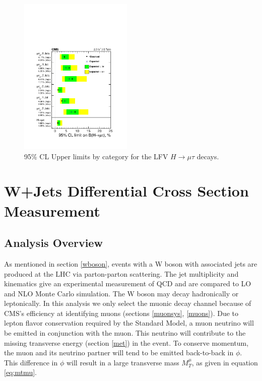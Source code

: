 \documentclass[oneside, letterpaper, oldfontcommands]{memoir}
\begin{document}
\begin{figure}[hbtp]\centering
\includegraphics[width=0.48\textwidth]{13TeVLimits.pdf}
 \caption{95\% CL Upper limits by category for the LFV $H \rightarrow \mu \tau$  decays.}
 \label{fig:limits_summary13TeV}\end{figure}



\chapter{W+Jets Differential Cross Section Measurement}\label{wjets}

\section{Analysis Overview}

\qquad As mentioned in section \ref{wboson}, events with a W boson with associated jets are produced at the LHC via parton-parton scattering. The jet multiplicity and kinematics give an experimental measurement of QCD and are compared to LO and NLO Monte Carlo simulation. The W boson may decay hadronically or leptonically. In this analysis we only select the muonic decay channel because of CMS's efficiency at identifying muons (sections \ref{muonsys}, \ref{muons}). Due to lepton flavor conservation required by the Standard Model, a muon neutrino will be emitted in conjunction with the muon. This neutrino will contribute to the missing transverse energy (section \ref{met}) in the event. To conserve momentum, the muon and its neutrino partner will tend to be emitted back-to-back in $\phi$. This difference in $\phi$ will result in a large transverse mass $M_{T}^{\mu}$, as given in equation \ref{eq:mtmu}. 
\end{document}

